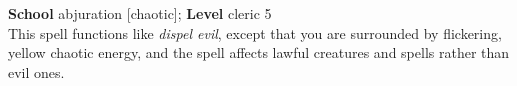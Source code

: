 \textbf{School} abjuration [chaotic]; \textbf{Level} cleric 5\\
This spell functions like \textit{dispel evil}, except that you are surrounded by flickering, yellow chaotic energy, and the spell affects lawful creatures and spells rather than evil ones.\\

